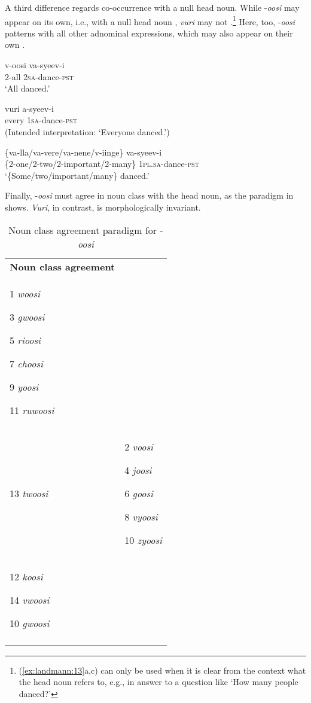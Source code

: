 \documentclass[output=paper]{langsci/langscibook}
\begin{document}
A third difference regards co-occurrence with a null head noun. While -\textit{oosi} may appear on its own, i.e., with a null head noun , \textit{vuri} may not .\footnote{(\ref{ex:landmann:13}a,c) can only be used when it is clear from the context what the head noun refers to, e.g., in answer to a question like ‘How many people danced?’
} Here, too, -\textit{oosi} patterns with all other adnominal expressions, which may also appear on their own .

\ea
\gll v-oosi    va-syeev-i      \\
     2-all    2\textsc{sa}-dance-\textsc{pst}\\
\glt ‘All danced.’
\z

\ea
\gll *vuri    a-syeev-i  \\
     every    1\textsc{sa}-dance-\textsc{pst}\\
\glt (Intended interpretation: ‘Everyone danced.’)
\z

\ea
\gll \{va-lla/va-vere/va-nene/v-iinge\}  va-syeev-i\\
     \{2-one/2-two/2-important/2-many\}  1\textsc{pl}.\textsc{sa}-dance-\textsc{pst}\\
\glt ‘\{Some/two/important/many\} danced.’
\z

  Finally, -\textit{oosi} must agree in noun class with the head noun, as the paradigm in  shows. \textit{Vuri}, in contrast, is morphologically invariant.

\begin{table}
\caption{Noun class agreement paradigm for -\textit{oosi}}
\label{tab:1}


\begin{tabularx}{\textwidth}{XX}
\lsptoprule
\hhline{-~}
{\bfseries Noun class agreement} & \\
1  \textit{woosi}

3  \textit{gwoosi}  

5  \textit{rioosi}

7  \textit{choosi}

9  \textit{yoosi}

11  \textit{ruwoosi}\\
13  \textit{twoosi} & 2  \textit{voosi}

4  \textit{joosi}

6  \textit{goosi}

8  \textit{vyoosi}

10  \textit{zyoosi}\\
12  \textit{koosi}    

14  \textit{vwoosi}

10  \textit{gwoosi}\\
\lspbottomrule
\end{tabularx}
\end{table}
\end{document}
